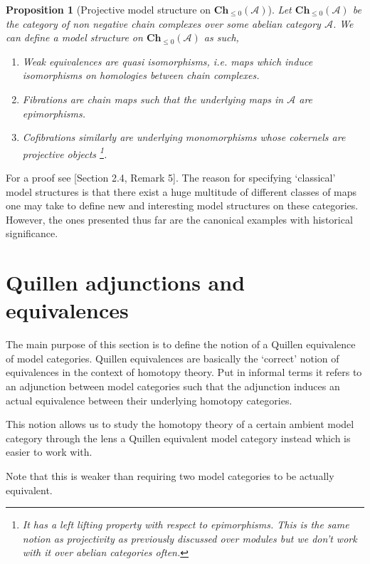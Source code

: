 \documentclass[12pt]{report}
\numberwithin{equation}{section}
\newtheorem{proposition}[dummy]{Proposition}
\begin{document}
	\begin{proposition}[Projective model structure on $\mathbf{Ch}_{\leq 0}(\mathcal{A})$]
		Let $\mathbf{Ch}_{\leq 0}(\mathcal{A})$ be the category of non negative chain complexes over some abelian category $\mathcal{A}$. We can define a model structure on $\mathbf{Ch}_{\leq 0}(\mathcal{A})$ as such,
		\begin{enumerate}
			\item Weak equivalences are quasi isomorphisms, i.e. maps which induce isomorphisms on homologies between chain complexes.
			\item Fibrations are chain maps such that the underlying maps in $\mathcal{A}$ are epimorphisms.
			\item Cofibrations similarly are underlying monomorphisms whose cokernels are projective objects \footnote{It has a left lifting property with respect to epimorphisms. This is the same notion as projectivity as previously discussed over modules but we don't work with it over abelian categories often.}.	
		\end{enumerate}
	\end{proposition}
	For a proof see \cite{quillen1967homotopical}[Section 2.4, Remark 5].
	The reason for specifying `classical' model structures is that there exist a huge multitude of different classes of maps one may take to define new and interesting model structures on these categories. However, the ones presented thus far are the canonical examples with historical significance.
	
	\section{Quillen adjunctions and equivalences}
	
	The main purpose of this section is to define the notion of a Quillen equivalence of model categories. Quillen equivalences are basically the `correct' notion of equivalences in the context of homotopy theory. Put in informal terms it refers to an adjunction between model categories such that the adjunction induces an actual equivalence between their underlying homotopy categories. 
	
	This notion allows us to study the homotopy theory of a certain ambient model category through the lens a Quillen equivalent model category instead which is easier to work with.
	
	Note that this is weaker than requiring two model categories to be actually equivalent.
	
\end{document}
